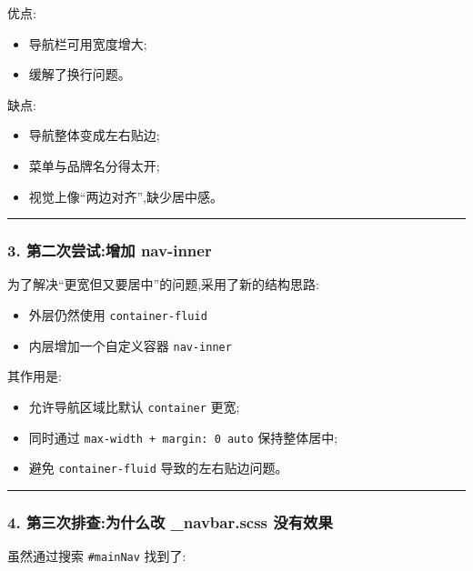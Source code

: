 \documentclass[lang=cn,scheme=chinese,color=blue,device=normal,toc=onecol,math=cm]{elegantbook}
\begin{document}
优点:\par


\begin{itemize}
\item 导航栏可用宽度增大;
\item 缓解了换行问题。
\end{itemize}


缺点:\par


\begin{itemize}
\item 导航整体变成左右贴边;
\item 菜单与品牌名分得太开;
\item 视觉上像“两边对齐”,缺少居中感。
\end{itemize}


\medskip\hrule\medskip


\subsubsection{3. 第二次尝试:增加 nav-inner}


为了解决“更宽但又要居中”的问题,采用了新的结构思路:\par


\begin{itemize}
\item 外层仍然使用 \texttt{container-fluid}
\item 内层增加一个自定义容器 \texttt{nav-inner}
\end{itemize}


其作用是:\par


\begin{itemize}
\item 允许导航区域比默认 \texttt{container} 更宽;
\item 同时通过 \texttt{max-width + margin: 0 auto} 保持整体居中;
\item 避免 \texttt{container-fluid} 导致的左右贴边问题。
\end{itemize}


\medskip\hrule\medskip


\subsubsection{4. 第三次排查:为什么改 \_\allowbreak{}navbar.scss 没有效果}


虽然通过搜索 \texttt{\#mainNav} 找到了:\par
\end{document}
